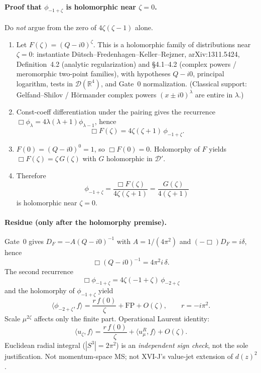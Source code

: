 \paragraph{Proof that \(\phi_{-1+\zeta}\) is holomorphic near \(\zeta=0\).}
Do \emph{not} argue from the zero of \(4\zeta(\zeta-1)\) alone.
\begin{enumerate}
\item Let \(F(\zeta)=(Q-i0)^\zeta\). This is a holomorphic family of
distributions near \(\zeta=0\): instantiate
D\"utsch--Fredenhagen--Keller--Rejzner,
arXiv:1311.5424, Definition~4.2 (analytic regularization) and
\S4.1--4.2 (complex powers / meromorphic two-point families), with
hypotheses \(Q-i0\), principal logarithm, tests in \(\mathcal D(\mathbb R^4)\),
and Gate~0 normalization. (Classical support: Gelfand--Shilov / H\"ormander
complex powers \((x\pm i0)^\lambda\) are entire in \(\lambda\).)
\item Const-coeff differentiation under the pairing gives the recurrence
\(\Box\phi_\lambda=4\lambda(\lambda+1)\phi_{\lambda-1}\), hence
\[
\Box F(\zeta)=4\zeta(\zeta+1)\,\phi_{-1+\zeta}.
\]
\item \(F(0)=(Q-i0)^0=1\), so \(\Box F(0)=0\). Holomorphy of \(F\) yields
\(\Box F(\zeta)=\zeta\,G(\zeta)\) with \(G\) holomorphic in \(\mathcal D'\).
\item Therefore
\[
\phi_{-1+\zeta}=\frac{\Box F(\zeta)}{4\zeta(\zeta+1)}=\frac{G(\zeta)}{4(\zeta+1)}
\]
is holomorphic near \(\zeta=0\).
\end{enumerate}

\paragraph{Residue (only after the holomorphy premise).}
Gate~0 gives \(D_F=-A(Q-i0)^{-1}\) with \(A=1/(4\pi^2)\) and
\((-\Box)D_F=i\delta\), hence
\[
\Box(Q-i0)^{-1}=4\pi^2 i\,\delta.
\]
The second recurrence
\[
\Box\phi_{-1+\zeta}=4\zeta(-1+\zeta)\,\phi_{-2+\zeta}
\]
and the holomorphy of \(\phi_{-1+\zeta}\) yield
\[
\langle\phi_{-2+\zeta},f\rangle=\frac{r\,f(0)}{\zeta}+\mathrm{FP}+O(\zeta),
\qquad\boxed{r=-i\pi^2}.
\]
Scale \(\mu^{2\zeta}\) affects only the finite part. Operational Laurent identity:
\[
\langle u_\zeta,f\rangle=\frac{r\,f(0)}{\zeta}+\langle u_\mu^R,f\rangle+O(\zeta).
\]
Euclidean radial integral (\(|S^3|=2\pi^2\)) is an \emph{independent sign check},
not the sole justification. Not momentum-space MS; not XVI-J's value-jet
extension of \(d(z)^2\).
